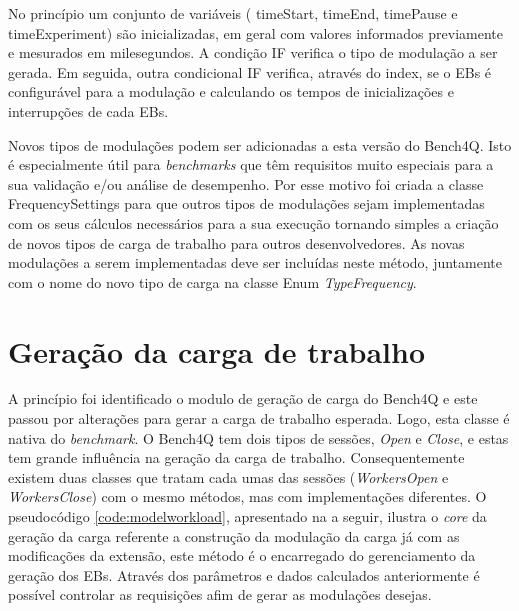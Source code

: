 No princípio um conjunto de variáveis ( \textsf{timeStart}, \textsf{timeEnd}, \textsf{timePause} e \textsf{timeExperiment}) são inicializadas, em geral com valores informados previamente e mesurados em milesegundos. A condição IF verifica o tipo de modulação a ser gerada. Em seguida, outra condicional IF verifica, através do index, se o EBs é configurável para a modulação e calculando os tempos de inicializações e interrupções de cada EBs.

\begin{codigo}[caption={Algoritmo calcula os tempos de inicialização e termino para cada um dos Clientes}, label={code:createProperties}, breaklines=true]
	ParametrosExperimento createProperties(Time tempoExperimento) {
		
		ParametrosExperimento parametros = new ParametrosExperimento();
		
		parametros.TempoIncial = calculaTempoInicial();
		parametros.TempoFinal = calculaTempoFinal();
		parametros.TempoPausa = calculaTempoPausa();
		
		retorna parametros;
	}
}
\end{codigo}

Novos tipos de modulações podem ser adicionadas a esta versão do Bench4Q. Isto é especialmente útil para \textit{benchmarks} que têm requisitos muito especiais para a sua validação e/ou análise de desempenho. Por esse motivo foi criada a classe \textsf{FrequencySettings} para que outros tipos de modulações sejam implementadas com os seus cálculos necessários para a sua execução tornando simples a criação de novos tipos de carga de trabalho para outros desenvolvedores. As novas modulações a serem implementadas deve ser incluídas neste método, juntamente com o nome do novo tipo de carga na classe Enum \textit{TypeFrequency}.

\section{Geração da carga de trabalho}
A princípio foi identificado o modulo de geração de carga do Bench4Q e este passou por alterações para gerar a carga de trabalho esperada. Logo, esta classe é nativa do \textit{benchmark}. O Bench4Q tem dois tipos de sessões, \textit{Open} e \textit{Close}, e estas tem grande influência na geração da carga de trabalho. Consequentemente existem duas classes que tratam cada umas das sessões (\textit{WorkersOpen} e \textit{WorkersClose}) com o mesmo métodos, mas com implementações diferentes.
O pseudocódigo \ref{code:modelworkload}, apresentado na a seguir, ilustra o \textit{core} da geração da carga referente a construção da modulação da carga já com as modificações da extensão, este método é o encarregado do gerenciamento da geração dos EBs. Através dos parâmetros e dados calculados anteriormente é possível controlar as requisições afim de gerar as modulações desejas. 

